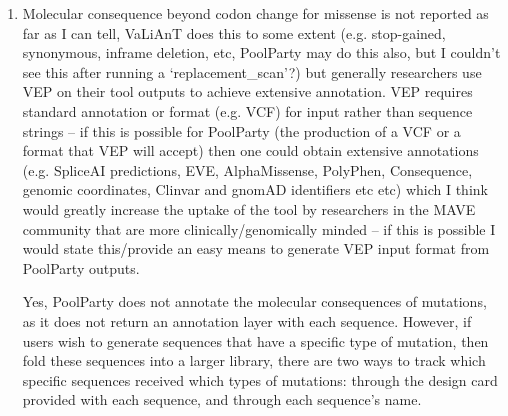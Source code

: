 \documentclass[11pt]{article}
\newenvironment{response}{\par\color{responseblue}}{\par}
\newenvironment{msquote}
  {\begin{quote}\color{responseblue}\itshape\noindent\ignorespaces}
  {\end{quote}}
\begin{document}
\begin{enumerate}




\item Molecular consequence beyond codon change for missense is not reported as
far as I can tell, VaLiAnT does this to some extent (e.g. stop-gained,
synonymous, inframe deletion, etc, PoolParty may do this also, but I couldn't
see this after running a `replacement\_scan'?) but generally researchers use VEP
on their tool outputs to achieve extensive annotation. VEP requires standard
annotation or format (e.g. VCF) for input rather than sequence strings -- if
this is possible for PoolParty (the production of a VCF or a format that VEP
will accept) then one could obtain extensive annotations (e.g. SpliceAI
predictions, EVE, AlphaMissense, PolyPhen, Consequence, genomic coordinates,
Clinvar and gnomAD identifiers etc etc) which I think would greatly increase the
uptake of the tool by researchers in the MAVE community that are more
clinically/genomically minded -- if this is possible I would state this/provide
an easy means to generate VEP input format from PoolParty outputs.

\begin{response}
Yes, PoolParty does not annotate the molecular consequences of mutations, as it does not return an annotation layer with each sequence. However, if users wish to generate sequences that have a specific type of mutation, then fold these sequences into a larger library, there are two ways to track which specific sequences received which types of mutations: through the design card provided with each sequence, and through each sequence's name.


\end{response}
\end{enumerate}
\end{document}
